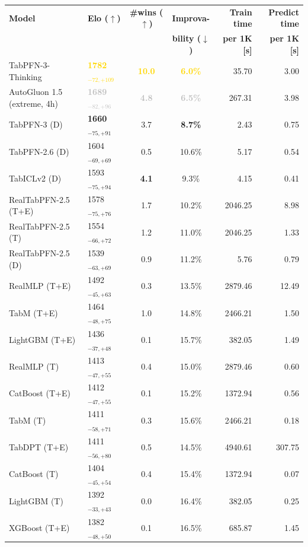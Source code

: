 \begin{tabular}{llccrr}
\toprule
\textbf{Model} & \textbf{Elo ($\uparrow$)} & \textbf{\#wins ($\uparrow$)} & \textbf{Improva-} & \textbf{Train time} & \textbf{Predict time} \\
 &  &  & \textbf{bility ($\downarrow$)} & \textbf{per 1K [s]} & \textbf{per 1K [s]} \\
\midrule
TabPFN-3-Thinking & \textcolor{gold}{\textbf{1782${}_{-72,+109}$}} & \textcolor{gold}{\textbf{10.0}} & \textcolor{gold}{\textbf{6.0\%}} & 35.70 & 3.00 \\
AutoGluon 1.5 (extreme, 4h) & \textcolor{silver}{\textbf{1689${}_{-82,+96}$}} & \textcolor{silver}{\textbf{4.8}} & \textcolor{silver}{\textbf{6.5\%}} & 267.31 & 3.98 \\
TabPFN-3 (D) & \textcolor{bronze}{\textbf{1660${}_{-75,+91}$}} & 3.7 & \textcolor{bronze}{\textbf{8.7\%}} & 2.43 & 0.75 \\
TabPFN-2.6 (D) & 1604${}_{-69,+69}$ & 0.5 & 10.6\% & 5.17 & 0.54 \\
TabICLv2 (D) & 1593${}_{-75,+94}$ & \textcolor{bronze}{\textbf{4.1}} & 9.3\% & 4.15 & 0.41 \\
RealTabPFN-2.5 (T+E) & 1578${}_{-75,+76}$ & 1.7 & 10.2\% & 2046.25 & 8.98 \\
RealTabPFN-2.5 (T) & 1554${}_{-66,+72}$ & 1.2 & 11.0\% & 2046.25 & 1.33 \\
RealTabPFN-2.5 (D) & 1539${}_{-63,+69}$ & 0.9 & 11.2\% & 5.76 & 0.79 \\
RealMLP (T+E) & 1492${}_{-45,+63}$ & 0.3 & 13.5\% & 2879.46 & 12.49 \\
TabM (T+E) & 1464${}_{-48,+75}$ & 1.0 & 14.8\% & 2466.21 & 1.50 \\
LightGBM (T+E) & 1436${}_{-37,+48}$ & 0.1 & 15.7\% & 382.05 & 1.49 \\
RealMLP (T) & 1413${}_{-47,+55}$ & 0.4 & 15.0\% & 2879.46 & 0.60 \\
CatBoost (T+E) & 1412${}_{-47,+55}$ & 0.1 & 15.2\% & 1372.94 & 0.56 \\
TabM (T) & 1411${}_{-58,+71}$ & 0.3 & 15.6\% & 2466.21 & 0.18 \\
TabDPT (T+E) & 1411${}_{-56,+80}$ & 0.5 & 14.5\% & 4940.61 & 307.75 \\
CatBoost (T) & 1404${}_{-45,+54}$ & 0.4 & 15.4\% & 1372.94 & 0.07 \\
LightGBM (T) & 1392${}_{-33,+43}$ & 0.0 & 16.4\% & 382.05 & 0.25 \\
XGBoost (T+E) & 1382${}_{-48,+50}$ & 0.1 & 16.5\% & 685.87 & 1.45 \\

\end{tabular}
